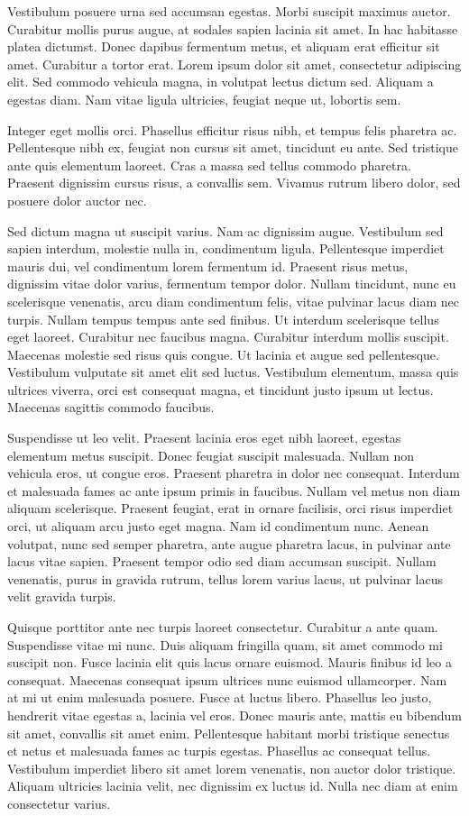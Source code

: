 Vestibulum posuere urna sed accumsan egestas. Morbi suscipit maximus auctor. Curabitur mollis purus augue, at sodales sapien lacinia sit amet. In hac habitasse platea dictumst. Donec dapibus fermentum metus, et aliquam erat efficitur sit amet. Curabitur a tortor erat. Lorem ipsum dolor sit amet, consectetur adipiscing elit. Sed commodo vehicula magna, in volutpat lectus dictum sed. Aliquam a egestas diam. Nam vitae ligula ultricies, feugiat neque ut, lobortis sem.

Integer eget mollis orci. Phasellus efficitur risus nibh, et tempus felis pharetra ac. Pellentesque nibh ex, feugiat non cursus sit amet, tincidunt eu ante. Sed tristique ante quis elementum laoreet. Cras a massa sed tellus commodo pharetra. Praesent dignissim cursus risus, a convallis sem. Vivamus rutrum libero dolor, sed posuere dolor auctor nec.

Sed dictum magna ut suscipit varius. Nam ac dignissim augue. Vestibulum sed sapien interdum, molestie nulla in, condimentum ligula. Pellentesque imperdiet mauris dui, vel condimentum lorem fermentum id. Praesent risus metus, dignissim vitae dolor varius, fermentum tempor dolor. Nullam tincidunt, nunc eu scelerisque venenatis, arcu diam condimentum felis, vitae pulvinar lacus diam nec turpis. Nullam tempus tempus ante sed finibus. Ut interdum scelerisque tellus eget laoreet. Curabitur nec faucibus magna. Curabitur interdum mollis suscipit. Maecenas molestie sed risus quis congue. Ut lacinia et augue sed pellentesque. Vestibulum vulputate sit amet elit sed luctus. Vestibulum elementum, massa quis ultrices viverra, orci est consequat magna, et tincidunt justo ipsum ut lectus. Maecenas sagittis commodo faucibus.

Suspendisse ut leo velit. Praesent lacinia eros eget nibh laoreet, egestas elementum metus suscipit. Donec feugiat suscipit malesuada. Nullam non vehicula eros, ut congue eros. Praesent pharetra in dolor nec consequat. Interdum et malesuada fames ac ante ipsum primis in faucibus. Nullam vel metus non diam aliquam scelerisque. Praesent feugiat, erat in ornare facilisis, orci risus imperdiet orci, ut aliquam arcu justo eget magna. Nam id condimentum nunc. Aenean volutpat, nunc sed semper pharetra, ante augue pharetra lacus, in pulvinar ante lacus vitae sapien. Praesent tempor odio sed diam accumsan suscipit. Nullam venenatis, purus in gravida rutrum, tellus lorem varius lacus, ut pulvinar lacus velit gravida turpis.

Quisque porttitor ante nec turpis laoreet consectetur. Curabitur a ante quam. Suspendisse vitae mi nunc. Duis aliquam fringilla quam, sit amet commodo mi suscipit non. Fusce lacinia elit quis lacus ornare euismod. Mauris finibus id leo a consequat. Maecenas consequat ipsum ultrices nunc euismod ullamcorper. Nam at mi ut enim malesuada posuere. Fusce at luctus libero. Phasellus leo justo, hendrerit vitae egestas a, lacinia vel eros. Donec mauris ante, mattis eu bibendum sit amet, convallis sit amet enim. Pellentesque habitant morbi tristique senectus et netus et malesuada fames ac turpis egestas. Phasellus ac consequat tellus. Vestibulum imperdiet libero sit amet lorem venenatis, non auctor dolor tristique. Aliquam ultricies lacinia velit, nec dignissim ex luctus id. Nulla nec diam at enim consectetur varius.

